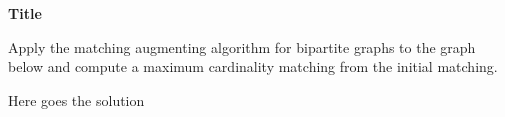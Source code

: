 \question \textbf{Title}

Apply the matching augmenting algorithm for bipartite graphs to the graph below and compute a maximum cardinality matching from the initial matching.




\begin{solution}
Here goes the solution
\end{solution}